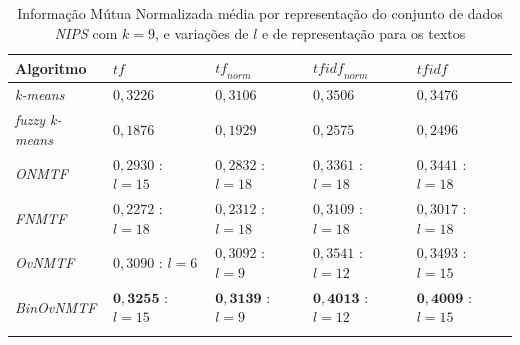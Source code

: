 \documentclass[
    12pt,                %
    oneside,            %
    a4paper,            %
    english,            %
    brazil                %
    ]{abntex2ppgsi}
\begin{document}
\begin{table}[H]
\centering
    \caption{Informação Mútua Normalizada média por representação do conjunto de dados \textit{NIPS} com $k = 9$, e variações de $l$ e de representação para os textos}
    \begin{tabular}{lllll}
        \hline
        \textbf{Algoritmo}              & $\textit{tf}$ & $\textit{tf}_{norm}$ & $\textit{tfidf}_{norm}$ & $\textit{tfidf}$ \\
        \hline
        \textit{k-means}       & $0,3226$            & $0,3106$            & $0,3506$            & $0,3476$ \\
        \textit{fuzzy k-means} & $0,1876$            & $0,1929$            & $0,2575$            & $0,2496$ \\
        \textit{ONMTF}         & $0,2930$ : $l = 15$ & $0,2832$ : $l = 18$ & $0,3361$ : $l = 18$ & $0,3441$ : $l = 18$ \\
        \textit{FNMTF}         & $0,2272$ : $l = 18$ & $0,2312$ : $l = 18$ & $0,3109$ : $l = 18$ & $0,3017$ : $l = 18$ \\
        \textit{OvNMTF}        & $0,3090$ : $l = 6$  & $0,3092$ : $l = 9$  & $0,3541$ : $l = 12$ & $0,3493$ : $l = 15$ \\
        \textit{BinOvNMTF}     & $\mathbf{0,3255}$ : $l = 15$ & $\mathbf{0,3139}$ : $l = 9$  & $\mathbf{0,4013}$ : $l = 12$ & $\mathbf{0,4009}$ : $l = 15$ \\
        \hline \\
    \end{tabular}
    \label{tab:experiments-quant-nmi:nips}
\end{table}
\end{document}
